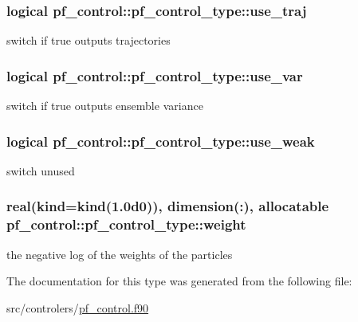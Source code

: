 \hypertarget{structpf__control_1_1pf__control__type_a6c3195c3fb580a3d68c0b449a5ce6ab1}{
\subsubsection[{use\-\_\-traj}]{\setlength{\rightskip}{0pt plus 5cm}logical pf\-\_\-control\-::pf\-\_\-control\-\_\-type\-::use\-\_\-traj}}\label{structpf__control_1_1pf__control__type_a6c3195c3fb580a3d68c0b449a5ce6ab1}


switch if true outputs trajectories 

\hypertarget{structpf__control_1_1pf__control__type_a0ddc8995c902c77e0a04f70f701f3a5b}{
\subsubsection[{use\-\_\-var}]{\setlength{\rightskip}{0pt plus 5cm}logical pf\-\_\-control\-::pf\-\_\-control\-\_\-type\-::use\-\_\-var}}\label{structpf__control_1_1pf__control__type_a0ddc8995c902c77e0a04f70f701f3a5b}


switch if true outputs ensemble variance 

\hypertarget{structpf__control_1_1pf__control__type_ac8097ede5f988970340635da9c936264}{
\subsubsection[{use\-\_\-weak}]{\setlength{\rightskip}{0pt plus 5cm}logical pf\-\_\-control\-::pf\-\_\-control\-\_\-type\-::use\-\_\-weak}}\label{structpf__control_1_1pf__control__type_ac8097ede5f988970340635da9c936264}


switch unused 

\hypertarget{structpf__control_1_1pf__control__type_a6924d4f75cbd9e358263f7cfe453e063}{
\subsubsection[{weight}]{\setlength{\rightskip}{0pt plus 5cm}real(kind=kind(1.\-0d0)), dimension(\-:), allocatable pf\-\_\-control\-::pf\-\_\-control\-\_\-type\-::weight}}\label{structpf__control_1_1pf__control__type_a6924d4f75cbd9e358263f7cfe453e063}


the negative log of the weights of the particles 



The documentation for this type was generated from the following file\-:\begin{DoxyCompactItemize}
\item 
src/controlers/\hyperlink{pf__control_8f90}{pf\-\_\-control.\-f90}\end{DoxyCompactItemize}
